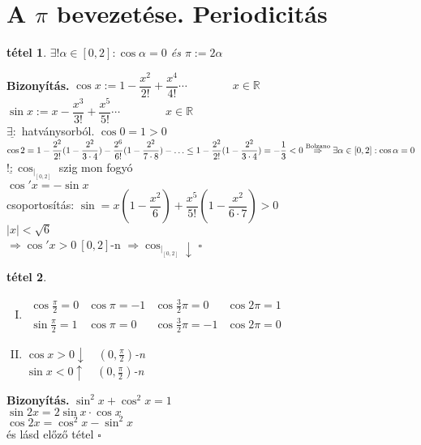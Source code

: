 \documentclass{article}
\newcommand{\ob}{\hfill$\square$}
\newcommand{\R}{\mathbb{R}}
\newcommand{\nn}{\Rightarrow}
\theoremstyle{magyar}
\newtheorem{te}{tétel}[section]
\newenvironment{biz}{\begin{trivlist}\item\relax\mbox{\textbf{Bizonyítás.\enskip}}\ignorespaces}{\ob\end{trivlist}}
\begin{document}
  \section{A $\pi$ bevezetése. Periodicitás}
  \begin{te}
    $\exists!\alpha\in[0,2]:\cos\alpha = 0$ és $\pi := 2\alpha$
  \end{te}
  \begin{biz}
    $\cos x := 1 - \dfrac{x^2}{2!} + \dfrac{x^4}{4!}\cdots\qquad\qquad
    x\in\R$\\
    $\sin x := x - \dfrac{x^3}{3!} + \dfrac{x^5}{5!}\cdots\qquad\qquad
    x\in\R$\\
    $\underline{\exists:}$ hatványsorból. $\cos0 = 1 >0$\\
    $\cos2 = 1- \dfrac{2^2}{2!}(1-\dfrac{2^2}{3\cdot4})-
    \dfrac{2^6}{6!}(1-\dfrac{2^2}{7\cdot8})-\ldots \le   1-
    \dfrac{2^2}{2!}(1-\dfrac{2^2}{3\cdot4}) = -\dfrac13 < 0
    \\\overset{\mathrm{Bolzano}}{\nn} \exists \alpha\in[0,2]:
    \cos\alpha = 0$\\
    $\underline{!:}\cos_{|_{[0,2]}}$ szig mon fogyó\\
    $\cos'x=-\sin x$\\
    csoportosítás: $\sin  = x (1-\dfrac{x^2}6) +
    \dfrac{x^5}{5!}(1-\dfrac{x^2}{6\cdot7}) >0$\\
    $|x|<\sqrt{6} $\\
    $\nn \cos'x>0\ [0,2]$-n $\nn\cos_{|_{[0,2]}}\downarrow$
  \end{biz}
  \begin{te}\ 
    \begin{enumerate}[I.]
    \item 
      $
      \begin{array}{cccc}
	\cos\frac{\pi}2=0 & \cos\pi=-1 & \cos\frac32\pi=0 & \cos 2\pi=1\\
	\sin\frac{\pi}2=1 & \cos\pi=0 & \cos\frac32\pi=-1 & \cos 2\pi=0
      \end{array}
      $      
    \item 
      $\cos x > 0 \downarrow \quad (0,\frac{\pi}2)$-n\\
      $\sin x < 0 \uparrow \quad (0,\frac{\pi}2)$-n
    \end{enumerate}
  \end{te}
  \begin{biz}
    $\sin^2 x + \cos^2 x = 1$\\
    $\sin 2x = 2\sin x \cdot \cos x$\\
    $\cos  2x = \cos^2 x - \sin^2 x$\\ 
    és lásd előző tétel
  \end{biz}
\end{document}
